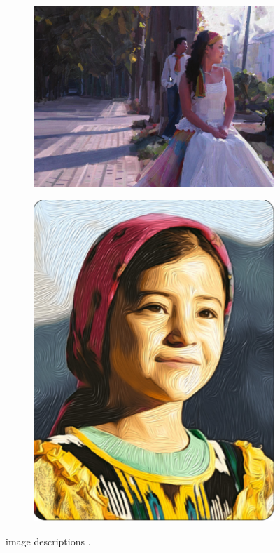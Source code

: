 \begin{figure}[!ht]
\centering
    \begin{subfigure}[b]{0.6\textwidth}
        \includegraphics[width=\textwidth]{images/related/imageparse}
        \caption{}
    \end{subfigure}
    \begin{subfigure}[b]{0.33\textwidth}
        \includegraphics[width=\textwidth]{images/related/oilpaint}
        \caption{}
    \end{subfigure}
\caption{image descriptions \cite{Youtube}.}
\label{i:imageParse2Oil}
\end{figure}